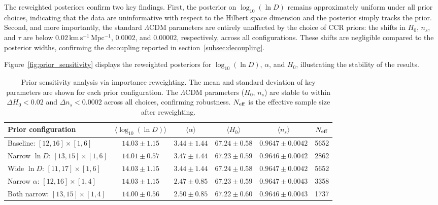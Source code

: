 The reweighted posteriors confirm two key findings. First, the posterior
on $\log_{10}(\ln D)$ remains approximately uniform under all prior
choices, indicating that the data are uninformative with respect to the
Hilbert space dimension and the posterior simply tracks the prior.
Second, and more importantly, the standard $\Lambda$CDM parameters
are entirely unaffected by the choice of CCR priors: the shifts in
$H_0$, $n_s$, and $\tau$ are below $0.02\,\mathrm{km\,s^{-1}\,Mpc^{-1}}$,
$0.0002$, and $0.00002$, respectively, across all configurations. These
shifts are negligible compared to the posterior widths, confirming the
decoupling reported in section~\ref{subsec:decoupling}.

Figure~\ref{fig:prior_sensitivity} displays the reweighted posteriors
for $\log_{10}(\ln D)$, $\alpha$, and $H_0$, illustrating the stability
of the results.

\begin{table}[t]
  \centering
  \begin{tabular}{lccccc}
    \hline\hline
    Prior configuration & $\langle\log_{10}(\ln D)\rangle$
      & $\langle\alpha\rangle$ & $\langle H_0\rangle$
      & $\langle n_s\rangle$ & $N_{\rm eff}$ \\
    \hline
    Baseline: $[12, 16] \times [1, 6]$
      & $14.03 \pm 1.15$ & $3.44 \pm 1.44$ & $67.24 \pm 0.58$
      & $0.9647 \pm 0.0042$ & 5652 \\
    Narrow $\ln D$: $[13, 15] \times [1, 6]$
      & $14.01 \pm 0.57$ & $3.47 \pm 1.44$ & $67.23 \pm 0.59$
      & $0.9646 \pm 0.0042$ & 2862 \\
    Wide $\ln D$: $[11, 17] \times [1, 6]$
      & $14.03 \pm 1.15$ & $3.44 \pm 1.44$ & $67.24 \pm 0.58$
      & $0.9647 \pm 0.0042$ & 5652 \\
    Narrow $\alpha$: $[12, 16] \times [1, 4]$
      & $14.03 \pm 1.15$ & $2.47 \pm 0.85$ & $67.23 \pm 0.59$
      & $0.9647 \pm 0.0043$ & 3358 \\
    Both narrow: $[13, 15] \times [1, 4]$
      & $14.00 \pm 0.56$ & $2.50 \pm 0.85$ & $67.22 \pm 0.60$
      & $0.9646 \pm 0.0043$ & 1737 \\
    \hline\hline
  \end{tabular}
  \caption{Prior sensitivity analysis via importance reweighting. The
    mean and standard deviation of key parameters are shown for each
    prior configuration. The $\Lambda$CDM parameters ($H_0$, $n_s$) are
    stable to within $\Delta H_0 < 0.02$ and $\Delta n_s < 0.0002$
    across all choices, confirming robustness. $N_{\rm eff}$ is the
    effective sample size after reweighting.}
  \label{tab:prior_sensitivity}
\end{table}

